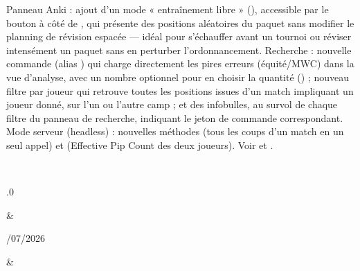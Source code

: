 \documentclass[letterpaper,10pt,french]{sphinxmanual}
\begin{document}
\begin{savenotes}
\begin{longtable}{}
\begin{varwidth}[t]{}
Panneau Anki : ajout d’un mode « entraînement libre » (), accessible par le bouton  à côté de , qui présente des positions aléatoires du paquet sans modifier le planning de révision espacée — idéal pour s’échauffer avant un tournoi ou réviser intensément un paquet sans en perturber l’ordonnancement. Recherche : nouvelle commande  (alias ) qui charge directement les pires erreurs (équité/MWC) dans la vue d’analyse, avec un nombre optionnel pour en choisir la quantité () ; nouveau filtre par joueur  qui retrouve toutes les positions issues d’un match impliquant un joueur donné, sur l’un ou l’autre camp ; et des info\sphinxhyphen{}bulles, au survol de chaque filtre du panneau de recherche, indiquant le jeton de commande correspondant. Mode serveur (headless) : nouvelles méthodes  (tous les coups d’un match en un seul appel) et  (Effective Pip Count des deux joueurs). Voir {\hyperref[\detokenize{manuel:panneau-anki}]{}} et {\hyperref[\detokenize{cmd_mode:cmd-mode}]{}}.
\sphinxbeforeendvarwidth
\end{varwidth}%
\\
\sphinxhline\begin{varwidth}[t]{}
.0
\sphinxbeforeendvarwidth
\end{varwidth}%
&\begin{varwidth}[t]{}
/07/2026
\sphinxbeforeendvarwidth
\end{varwidth}%
&\begin{varwidth}[t]{}
\sphinxAtStartPar

\end{varwidth}
\end{longtable}
\end{savenotes}
\end{document}
